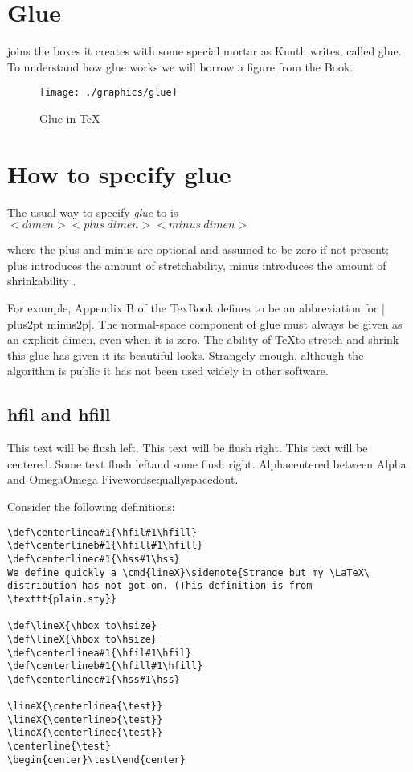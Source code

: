 \section{Glue}

\tex joins the boxes it creates with some special mortar as Knuth writes, called glue. To understand how glue works we will
borrow a figure from the \tex Book.

\begin{figure}
 \texttt{[image: ./graphics/glue]}
  \caption{Glue in \TeX}
  \label{fig:glue}
\end{figure}


\section{How to specify glue}

The usual way to specify \textit{glue} to \tex is
$<dimen>< plus~dimen><minus~dimen>$

where the plus and minus are optional and assumed to be zero if not
present; plus introduces the amount of stretchability, minus introduces the amount of shrinkability . 

For example, Appendix B of the TexBook defines  to be an abbreviation for
|\vskip6pt plus2pt minus2p|. The normal-space component of glue must always be
given as an explicit dimen, even when it is zero. The ability of \TeX to stretch and shrink this glue has given it its beautiful looks. Strangely enough, although the algorithm is public it has not been used widely in other software.



\subsection*{hfil and hfill}

{\obeylines
{This text will be flush left.\hfil}
{\hfil This text will be flush right.}
{\hfil This text will be centered.\hfil}
{Some text flush left\hfil and some flush right.}
{Alpha\hfil centered between Alpha and Omega\hfil Omega}
{Five\hfil words\hfil equally\hfil spaced\hfil out.}
}

Consider the following definitions:

\begin{verbatim}
\def\centerlinea#1{\hfil#1\hfill}
\def\centerlineb#1{\hfill#1\hfill}
\def\centerlinec#1{\hss#1\hss}
We define quickly a \cmd{lineX}\sidenote{Strange but my \LaTeX\ distribution has not got on. (This definition is from \texttt{plain.sty}}

\def\lineX{\hbox to\hsize}
\def\lineX{\hbox to\hsize}
\def\centerlinea#1{\hfil#1\hfil}
\def\centerlineb#1{\hfill#1\hfill}
\def\centerlinec#1{\hss#1\hss}

\lineX{\centerlinea{\test}}
\lineX{\centerlineb{\test}}
\lineX{\centerlinec{\test}}
\centerline{\test}
\begin{center}\test\end{center}

\end{verbatim}


